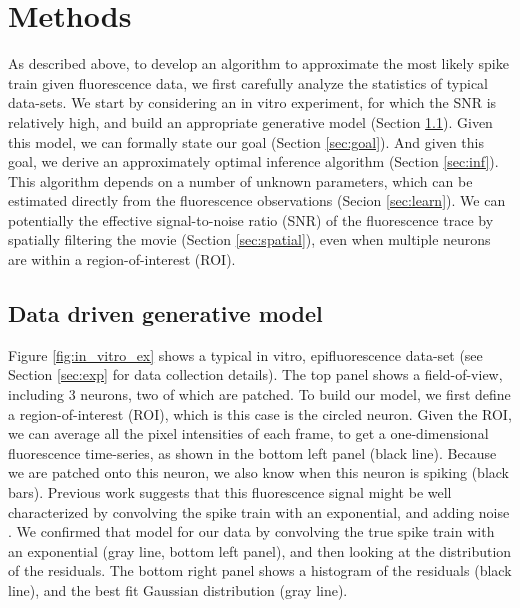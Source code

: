 \section{Methods} \label{sec:methods}

As described above, to develop an algorithm to approximate the most likely spike train given fluorescence data, we first carefully analyze the statistics of typical data-sets.  We start by considering an in vitro experiment, for which the SNR is relatively high, and build an appropriate generative model (Section \ref{sec:model}).  Given this model, we can formally state our goal (Section \ref{sec:goal}).  And given this goal, we derive an approximately optimal inference algorithm (Section \ref{sec:inf}).  This algorithm depends on a number of unknown parameters, which can be estimated directly from the fluorescence observations (Secion \ref{sec:learn}).  We can potentially the effective signal-to-noise ratio (SNR) of the fluorescence trace by spatially filtering the movie (Section \ref{sec:spatial}), even when multiple neurons are within a region-of-interest (ROI).  


\subsection{Data driven generative model} \label{sec:model}

Figure \ref{fig:in_vitro_ex} shows a typical in vitro, epifluorescence data-set (see Section \ref{sec:exp} for data collection details).  The top panel shows a field-of-view, including 3 neurons, two of which are patched.  To build our model, we first define a region-of-interest (ROI),  which is this case is the circled neuron.  Given the ROI, we can average all the pixel intensities of each frame, to get a one-dimensional fluorescence time-series, as shown in the bottom left panel (black line).  Because we are patched onto this neuron, we also know when this neuron is spiking (black bars). Previous work suggests that this fluorescence signal might be well characterized by convolving the spike train with an exponential, and adding noise \cite{ImagingManual}.  We confirmed that model for our data by convolving the true spike train with an exponential (gray line, bottom left panel), and then looking at the distribution of the residuals.  The bottom right panel shows a histogram of the residuals (black line), and the best fit Gaussian distribution (gray line).



